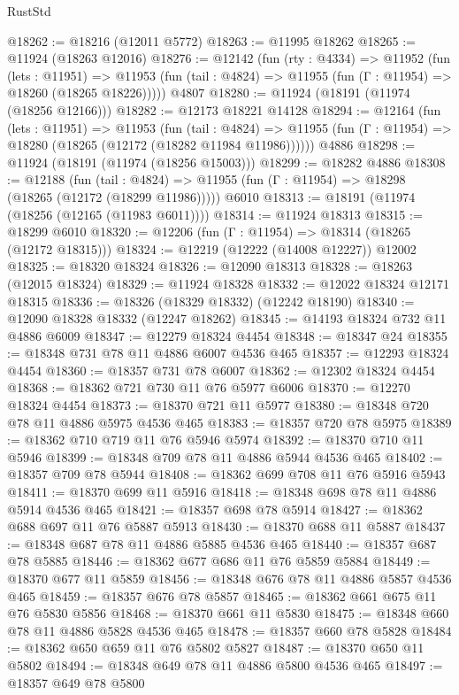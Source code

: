 \begin{lexlean}{RustStd}
\begin{coremodule}
{\begin{coremodule}
{{{{{{{{{{{{{{{{{{{{{{{{{{{{{{{{{{{{{{{{{{{{{{{{{{{{{{{{{{{{{{{{{{{{{{{{{{{{{{{{@18262 := @18216 (@12011 @5772)
@18263 := @11995 @18262
@18265 := @11924 (@18263 @12016)
@18276 := @12142
    (fun (rty : @4334) =>
    @11952
      (fun (lets : @11951) =>
      @11953 (fun (tail : @4824) => @11955 (fun (Γ : @11954) => @18260 (@18265 @18226)))))
    @4807
@18280 := @11924 (@18191 (@11974 (@18256 @12166)))
@18282 := @12173 @18221 @14128
@18294 := @12164
    (fun (lets : @11951) =>
    @11953
      (fun (tail : @4824) =>
      @11955 (fun (Γ : @11954) => @18280 (@18265 (@12172 (@18282 @11984 @11986))))))
    @4886
@18298 := @11924 (@18191 (@11974 (@18256 @15003)))
@18299 := @18282 @4886
@18308 := @12188
    (fun (tail : @4824) => @11955 (fun (Γ : @11954) => @18298 (@18265 (@12172 (@18299 @11986)))))
    @6010
@18313 := @18191 (@11974 (@18256 (@12165 (@11983 @6011))))
@18314 := @11924 @18313
@18315 := @18299 @6010
@18320 := @12206 (fun (Γ : @11954) => @18314 (@18265 (@12172 @18315)))
@18324 := @12219 (@12222 (@14008 @12227)) @12002
@18325 := @18320 @18324
@18326 := @12090 @18313
@18328 := @18263 (@12015 @18324)
@18329 := @11924 @18328
@18332 := @12022 @18324 @12171 @18315
@18336 := @18326 (@18329 @18332) (@12242 @18190)
@18340 := @12090 @18328 @18332 (@12247 @18262)
@18345 := @14193 @18324 @732 @11 @4886 @6009
@18347 := @12279 @18324 @4454
@18348 := @18347 @24
@18355 := @18348 @731 @78 @11 @4886 @6007 @4536 @465
@18357 := @12293 @18324 @4454
@18360 := @18357 @731 @78 @6007
@18362 := @12302 @18324 @4454
@18368 := @18362 @721 @730 @11 @76 @5977 @6006
@18370 := @12270 @18324 @4454
@18373 := @18370 @721 @11 @5977
@18380 := @18348 @720 @78 @11 @4886 @5975 @4536 @465
@18383 := @18357 @720 @78 @5975
@18389 := @18362 @710 @719 @11 @76 @5946 @5974
@18392 := @18370 @710 @11 @5946
@18399 := @18348 @709 @78 @11 @4886 @5944 @4536 @465
@18402 := @18357 @709 @78 @5944
@18408 := @18362 @699 @708 @11 @76 @5916 @5943
@18411 := @18370 @699 @11 @5916
@18418 := @18348 @698 @78 @11 @4886 @5914 @4536 @465
@18421 := @18357 @698 @78 @5914
@18427 := @18362 @688 @697 @11 @76 @5887 @5913
@18430 := @18370 @688 @11 @5887
@18437 := @18348 @687 @78 @11 @4886 @5885 @4536 @465
@18440 := @18357 @687 @78 @5885
@18446 := @18362 @677 @686 @11 @76 @5859 @5884
@18449 := @18370 @677 @11 @5859
@18456 := @18348 @676 @78 @11 @4886 @5857 @4536 @465
@18459 := @18357 @676 @78 @5857
@18465 := @18362 @661 @675 @11 @76 @5830 @5856
@18468 := @18370 @661 @11 @5830
@18475 := @18348 @660 @78 @11 @4886 @5828 @4536 @465
@18478 := @18357 @660 @78 @5828
@18484 := @18362 @650 @659 @11 @76 @5802 @5827
@18487 := @18370 @650 @11 @5802
@18494 := @18348 @649 @78 @11 @4886 @5800 @4536 @465
@18497 := @18357 @649 @78 @5800
}}}}}}}}}}}}}}}}}}}}}}}}}}}}}}}}}}}}}}}}}}}}}}}}}}}}}}}}}}}}}}}}}}}}}}}}}}}}}}}}
\end{coremodule}}
\end{coremodule}
\end{lexlean}
